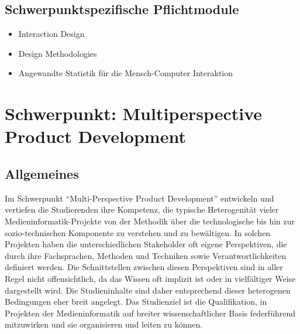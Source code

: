 \section*{Schwerpunktspezifische
Pflichtmodule\label{/mi-2017/modulbeschreibungen-master/schwerpunkt-human-computer-interaction}}\label{schwerpunktspezifische-pflichtmodulepathlabelmi-2017modulbeschreibungen-masterschwerpunkt-human-computer-interaction}

\begin{itemize}
\tightlist
\item
  Interaction Design
\item
  Design Methodologies
\item
  Angewandte Statistik für die Mensch-Computer Interaktion
\end{itemize}

\chapter{Schwerpunkt: Multiperspective Product
Development\label{/mi-2017/modulbeschreibungen-master/schwerpunkt-multiperspective-product-development}}\label{schwerpunkt-multiperspective-product-developmentpathlabelmi-2017modulbeschreibungen-masterschwerpunkt-multiperspective-product-development}

\section*{Allgemeines\label{/mi-2017/modulbeschreibungen-master/schwerpunkt-multiperspective-product-development}}\label{allgemeinespathlabelmi-2017modulbeschreibungen-masterschwerpunkt-multiperspective-product-development}

Im Schwerpunkt ``Multi-Perspective Product Development'' entwickeln und
vertiefen die Studierenden ihre Kompetenz, die typische Heterogenität
vieler Medieninformatik-Projekte von der Methodik über die
technologische bis hin zur sozio-technischen Komponente zu verstehen und
zu bewältigen. In solchen Projekten haben die unterschiedlichen
Stakeholder oft eigene Perspektiven, die durch ihre Fachsprachen,
Methoden und Techniken sowie Verantwortlichkeiten definiert werden. Die
Schnittstellen zwischen diesen Perspektiven sind in aller Regel nicht
offensichtlich, da das Wissen oft implizit ist oder in vielfältiger
Weise dargestellt wird. Die Studieninhalte sind daher entsprechend
dieser heterogenen Bedingungen eher breit angelegt. Das Studienziel ist
die Qualifikation, in Projekten der Medieninformatik auf breiter
wissenschaftlicher Basis federführend mitzuwirken und sie organisieren
und leiten zu können.

